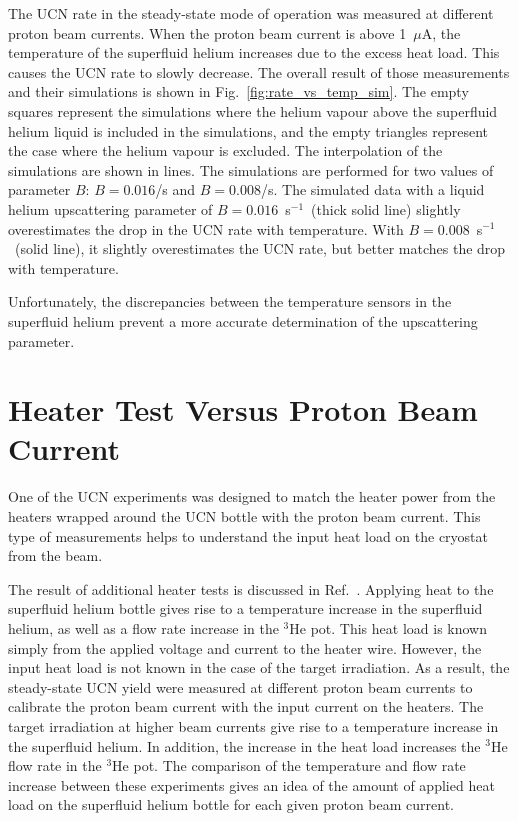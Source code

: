 The UCN rate in the steady-state mode of operation was measured at
different proton beam currents. When the proton beam current is above
1~$\mu$A, the temperature of the superfluid helium increases due to
the excess heat load. This causes the UCN rate to slowly decrease. The
overall result of those measurements and their simulations is shown
in Fig.~\ref{fig:rate_vs_temp_sim}. The empty squares represent the
simulations where the helium vapour above the superfluid helium liquid
is included in the simulations, and the empty triangles represent the
case where the helium vapour is excluded. The interpolation of the
simulations are shown in lines. The simulations are performed for two
values of parameter $B$: $B = 0.016$/s and $B = 0.008$/s. The
simulated data with a liquid helium upscattering parameter of
$B= 0.016$~s$^{-1}$~(thick solid line) slightly overestimates the drop
in the UCN rate with temperature. With $B= 0.008$~s$^{-1}$~(solid
line), it slightly overestimates the UCN rate, but better matches the
drop with temperature.

Unfortunately, the discrepancies between the temperature sensors in
the superfluid helium prevent a more accurate determination of the
upscattering parameter.

\section{Heater Test Versus Proton Beam Current}
One of the UCN experiments was designed to match the heater power from
the heaters wrapped around the UCN bottle with the proton beam
current. This type of measurements helps to understand the input heat
load on the cryostat from the beam.

The result of additional heater tests is discussed in
Ref.~\cite{Florian_thesis}. Applying heat to the superfluid helium
bottle gives rise to a temperature increase in the superfluid helium,
as well as a flow rate increase in the $^3$He pot. This heat load is
known simply from the applied voltage and current to the heater
wire. However, the input heat load is not known in the case of the
target irradiation. As a result, the steady-state UCN yield were
measured at different proton beam currents to calibrate the proton
beam current with the input current on the heaters. The target
irradiation at higher beam currents give rise to a temperature
increase in the superfluid helium. In addition, the increase in the
heat load increases the $^3$He flow rate in the $^3$He pot. The
comparison of the temperature and flow rate increase between these
experiments gives an idea of the amount of applied heat load on the
superfluid helium bottle for each given proton beam current.

